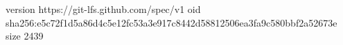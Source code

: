version https://git-lfs.github.com/spec/v1
oid sha256:e5c72f1d5a86d4c5e12fc53a3e917c8442d58812506ea3fa9c580bbf2a52673e
size 2439
